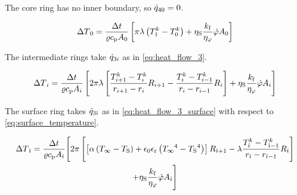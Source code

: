 \documentclass{PyRollDocs}
\begin{document}
    \noindent The core ring has no inner boundary, so ${\dot{q}}_{40} = 0$.

    \begin{equation}
        {\Delta T}_0 = \frac{{\Delta t}}{{\varrho}{c_\mathrm{p}}{A}_0} \left[ \pi {\lambda} \left( {T}_1^{k} - {T}_0^{k} \right) + {\eta_\mathrm{S}} \frac{{k_\mathrm{f}}}{{\eta_\varphi}} {\dot{\varphi}} {A}_0 \right]
        \label{eq:increment_core}
    \end{equation}

    \noindent The intermediate rings take ${\dot{q}}_{3{i}}$ as in \autoref{eq:heat_flow_3}.

    \begin{equation}
        {\Delta T}_{i} = \frac{{\Delta t}}{{\varrho}{c_\mathrm{p}}{A}_{i}}
        \left[
        2 \pi {\lambda} \left[
            \frac{{T}_{{i}+1}^{k} - {T}_{i}^{k}}{{r}_{{i}+1}-{r}_{{i}}}
            {R}_{{i}+1}
            -\frac{{T}_{{i}}^{k} - {T}_{{i}-1}^{k}}{{r}_{{i}}-{r}_{{i}-1}}
            {R}_{{i}}
            \right]
        + {\eta_\mathrm{S}} \frac{{k_\mathrm{f}}}{{\eta_\varphi}} {\dot{\varphi}} {A}_{{i}}
        \right]
        \label{eq:increment_layer}
    \end{equation}

    \noindent The surface ring takes ${\dot{q}}_{3{\hat{\imath}}}$ as in \autoref{eq:heat_flow_3_surface} with respect to \autoref{eq:surface_temperature}.

    \begin{multline}
        {\Delta T}_{\hat{\imath}} = \frac{{\Delta t}}{{\varrho}{c_\mathrm{p}}{A}_{\hat{\imath}}}
        \Biggl[
        2 \pi \left[
            \left[ {\alpha} \left( {T_\infty} - {T_\mathrm{S}} \right) + {\epsilon_0}{\epsilon_\mathrm{r}}\left( {T_\infty}^4 - {T_\mathrm{S}}^4 \right) \right]
            {R}_{{\hat{\imath}}+1}
            -{\lambda} \frac{{T}_{{\hat{\imath}}}^{k} - {T}_{{\hat{\imath}}-1}^{k}}{{r}_{{\hat{\imath}}}-{r}_{{\hat{\imath}}-1}}
            {R}_{{\hat{\imath}}}
            \right] \\
        + {\eta_\mathrm{S}} \frac{{k_\mathrm{f}}}{{\eta_\varphi}} {\dot{\varphi}} {A}_{{\hat{\imath}}}
        \Biggr]
        \label{eq:increment_surface}
    \end{multline}
\end{document}
